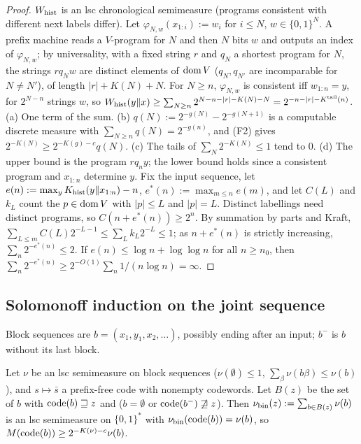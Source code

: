\begin{proof}
$W_{\mathrm{hist}}$ is an lsc chronological semimeasure (programs consistent with different next labels differ). Let $\varphi_{N,w}(x_{1:i}):=w_i$ for $i\le N$, $w\in\{0,1\}^N$. A prefix machine reads a $V$-program for $N$ and then $N$ bits $w$ and outputs an index of $\varphi_{N,w}$; by universality, with a fixed string $r$ and $q_N$ a shortest program for $N$, the strings $rq_Nw$ are distinct elements of $\operatorname{dom} V$ ($q_N,q_{N'}$ are incomparable for $N\ne N'$), of length $|r|+K(N)+N$. For $N\ge n$, $\varphi_{N,w}$ is consistent iff $w_{1:n}=y$, for $2^{N-n}$ strings $w$, so $W_{\mathrm{hist}}(y\Vert x)\ge\sum_{N\ge n}2^{N-n-|r|-K(N)-N}=2^{-n-|r|-K^{\mathrm{tail}}(n)}$.
(a) One term of the sum. (b) $q(N):=2^{-g(N)}-2^{-g(N+1)}$ is a computable discrete measure with $\sum_{N\ge n}q(N)=2^{-g(n)}$, and (F2) gives $2^{-K(N)}\ge2^{-K(g)-c}q(N)$. (c) The tails of $\sum_N2^{-K(N)}\le1$ tend to $0$.
(d) The upper bound is the program $rq_ny$; the lower bound holds since a consistent program and $x_{1:n}$ determine $y$. Fix the input sequence, let $e(n):=\max_yK_{\mathrm{hist}}(y\Vert x_{1:n})-n$, $e^*(n):=\max_{m\le n}e(m)$, and let $C(L)$ and $k_L$ count the $p\in\operatorname{dom} V$ with $|p|\le L$ and $|p|=L$. Distinct labellings need distinct programs, so $C(n+e^*(n))\ge2^n$. By summation by parts and Kraft, $\sum_{L\le m}C(L)2^{-L-1}\le\sum_Lk_L2^{-L}\le1$; as $n+e^*(n)$ is strictly increasing, $\sum_n2^{-e^*(n)}\le2$. If $e(n)\le\log n+\log\log n$ for all $n\ge n_0$, then $\sum_n2^{-e^*(n)}\ge2^{-O(1)}\sum_n1/(n\log n)=\infty$.
\end{proof}

\subsection{Solomonoff induction on the joint sequence}\label{app:hist:si}

Block sequences are $b=(x_1,y_1,x_2,\dots)$, possibly ending after an input; $b^-$ is $b$ without its last block.

\begin{lemma}\label{lem:hist:block}
Let $\nu$ be an lsc semimeasure on block sequences ($\nu(\emptyset)\le1$, $\sum_\beta\nu(b\beta)\le\nu(b)$), and $s\mapsto\bar s$ a prefix-free code with nonempty codewords. Let $B(z)$ be the set of $b$ with $\operatorname{code}(b)\sqsupseteq z$ and ($b=\emptyset$ or $\operatorname{code}(b^-)\not\sqsupseteq z$). Then $\nu_{\rm bin}(z):=\sum_{b\in B(z)}\nu(b)$ is an lsc semimeasure on $\{0,1\}^*$ with $\nu_{\rm bin}(\operatorname{code}(b))=\nu(b)$, so $M(\operatorname{code}(b))\ge2^{-K(\nu)-c}\nu(b)$.
\end{lemma}

